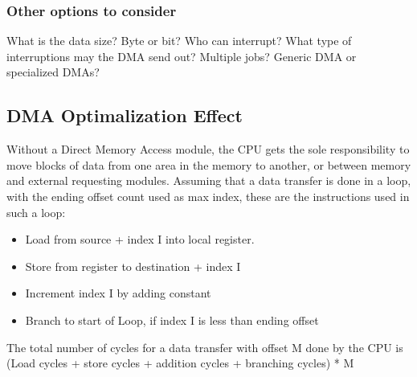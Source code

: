 \subsubsection{Other options to consider}
What is the data size? 
Byte or bit? 
Who can interrupt? 
What type of interruptions may the DMA send out? 
Multiple jobs?
Generic DMA or specialized DMAs?



\subsection{DMA Optimalization Effect}
Without a Direct Memory Access module, the CPU gets the sole responsibility to move blocks of data from one area in the memory to another, or between memory and external requesting modules.
Assuming that a data transfer is done in a loop, with the ending offset count used as max index, these are the instructions used in such a loop:
\begin{itemize}
    \item Load from source + index I into local register.
    \item Store from register to destination + index I
    \item Increment index I by adding constant
    \item Branch to start of Loop, if index I is less than ending offset
\end{itemize}

The total number of cycles for a data transfer with offset M done by the CPU is
\\ 
(Load cycles + store cycles + addition cycles + branching cycles) * M 
\\




















